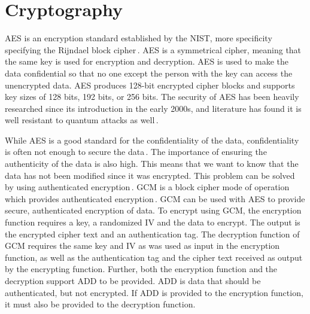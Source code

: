 \section{Cryptography}
\label{sec:back_crypto}
\gls{AES} is an encryption standard established by the \gls{NIST}, more specificity specifying the Rijndael block cipher\,\cite{kumarvermaPerformanceAnalysisRC62012}. \gls{AES} is a symmetrical cipher, meaning that the same key is used for encryption and decryption. \gls{AES} is used to make the data confidential so that no one except the person with the key can access the unencrypted data. \gls{AES} produces 128-bit encrypted cipher blocks and supports key sizes of 128 bits, 192 bits, or 256 bits. The security of \gls{AES} has been heavily researched since its introduction in the early 2000s, and literature has found it is well resistant to quantum attacks as well\,\cite{bonnetainQuantumSecurityAnalysis2019}.

While \gls{AES} is a good standard for the confidentiality of the data, confidentiality is often not enough to secure the data\,\cite{rosswallrabensteinWhenItComes2021}. The importance of ensuring the authenticity of the data is also high. This means that we want to know that the data has not been modified since it was encrypted. This problem can be solved by using authenticated encryption\,\cite{khovratovichAnswerWhyShould2013}. \gls{GCM} is a block cipher mode of operation which provides authenticated encryption\,\cite{mcgrewGaloisCounterMode2004}. \gls{GCM} can be used with \gls{AES} to provide secure, authenticated encryption of data. To encrypt using \gls{GCM}, the encryption function requires a key, a randomized \gls{IV} and the data to encrypt. The output is the encrypted cipher text and an authentication tag. The decryption function of \gls{GCM} requires the same key and \gls{IV} as was used as input in the encryption function, as well as the authentication tag and the cipher text received as output by the encrypting function. Further, both the encryption function and the decryption support \gls{ADD} to be provided. \gls{ADD} is data that should be authenticated, but not encrypted. If \gls{ADD} is provided to the encryption function, it must also be provided to the decryption function.

